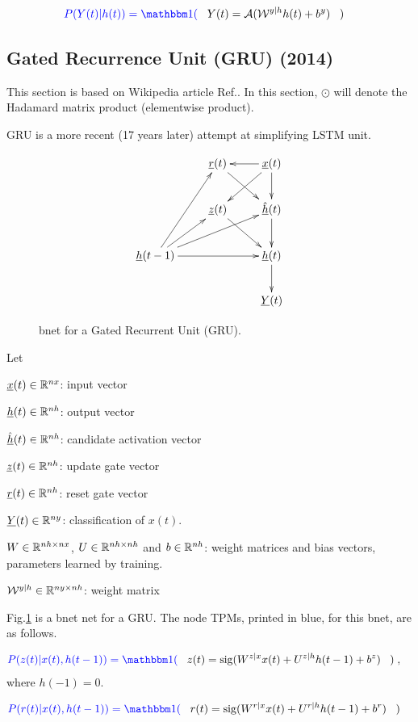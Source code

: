 \begin{align}\color{blue}
P(Y(t)|h(t))=\indi(\;\;\;&
Y(t)= \cala(\calw^{y|h}h(t) + b^y)
\;\;\;)
\end{align}

\newpage
\subsection{Gated Recurrence Unit
 (GRU) (2014)}

This 
section is based 
on Wikipedia article Ref.\cite{gru}. In this section,
$\odot$
will denote the Hadamard matrix product
(elementwise product).

GRU is a more recent (17 years later)
attempt at simplifying LSTM unit.

\begin{figure}[h!]
\centering
$$\xymatrix{
&\rvr(t)\ar[dr]&\rvx(t)\ar[d]\ar[dl]\ar[l]
\\
&\rvz(t)\ar[dr]
&\hat{\rvh}(t)\ar[d]
\\
\rvh(t-1)\ar[ur]\ar[rr]\ar[urr]\ar[uur]
&&\rvh(t)\ar[d]
\\
&&\rvY(t)
}$$
\caption{bnet for a Gated
Recurrent Unit (GRU).}
\label{fig-rnn-gru}
\end{figure}

Let

${\underline{x}}(t)\in { \mathbb{R}}^{nx}$: input vector

${\underline{h}}(t)\in{ \mathbb{R}}^{nh}$: output vector

$\hat{{\underline{h}}}(t)\in{ \mathbb{R}}^{nh}$: candidate activation vector

${\underline{z}}(t)\in{ \mathbb{R}}^{nh}$: update gate vector

${\underline{r}}(t)\in{ \mathbb{R}}^{nh}$: reset gate vector

${\underline{Y}}(t)\in { \mathbb{R}}^{ny}$:
classification of $x(t)$.

$W\in { \mathbb{R}}^{nh\times nx}$,
$U\in { \mathbb{R}}^{nh\times nh}$
and 
$b\in { \mathbb{R}}^{nh}$:
weight matrices and bias vectors,
 parameters learned by training.

${\cal W}^{y|h}\in { \mathbb{R}}^{ny\times nh}$:
 weight matrix

Fig.\ref{fig-rnn-gru}
is a bnet net
for a GRU.
The node TPMs, printed in blue,
for this bnet, are
as follows.


\begin{align}\color{blue}
P(z(t)|x(t),h(t-1))=\indi(\;\;\;&
z(t) = \sig(W^{z|x} x(t) + U^{z|h} h(t-1) + b^z)
\;\;\;)
\;,
\end{align}
where $h(-1)=0$.

\begin{align}\color{blue}
P(r(t)|x(t), h(t-1))=\indi(\;\;\;&
r(t) = \sig(W^{r|x} x(t) + U^{r|h} h(t-1) + b^r)
\;\;\;)
\end{align}


